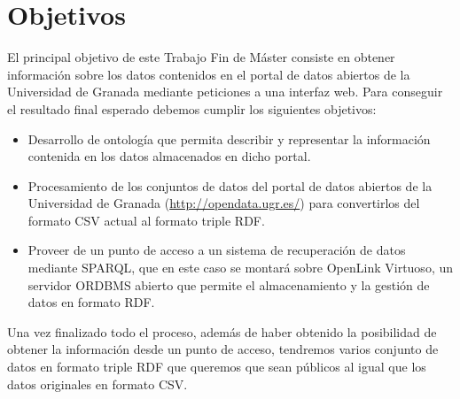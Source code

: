 \chapter{Objetivos}

El principal objetivo de este Trabajo Fin de Máster consiste en obtener información sobre los datos contenidos en el portal de datos abiertos de la Universidad de Granada mediante peticiones a una interfaz web. Para conseguir el resultado final esperado debemos cumplir los siguientes objetivos:

\begin{itemize}
	\item Desarrollo de ontología que permita describir y representar la información contenida en los datos almacenados en dicho portal.
	\item Procesamiento de los conjuntos de datos del portal de datos abiertos de la Universidad de Granada (\url{http://opendata.ugr.es/}) para convertirlos del formato CSV actual al formato triple RDF.
	\item Proveer de un punto de acceso a un sistema de recuperación de datos mediante SPARQL, que en este caso se montará sobre OpenLink Virtuoso, un servidor ORDBMS abierto que permite el almacenamiento y la gestión de datos en formato RDF.
\end{itemize}

Una vez finalizado todo el proceso, además de haber obtenido la posibilidad de obtener la información desde un punto de acceso, tendremos varios conjunto de datos en formato triple RDF que queremos que sean públicos al igual que los datos originales en formato CSV. 

